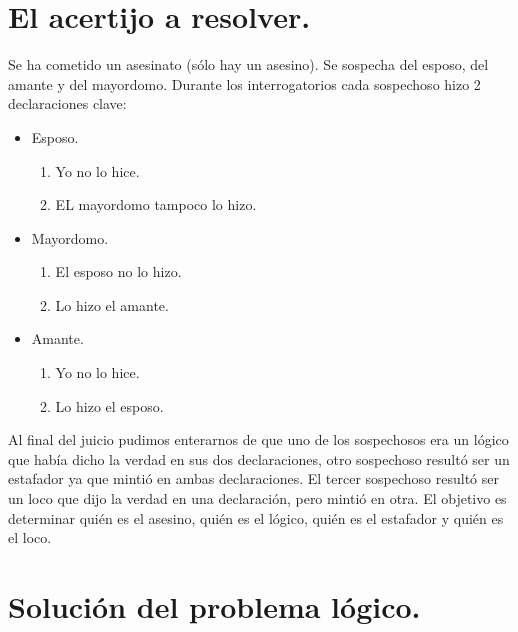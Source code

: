 \documentclass[letterpaper,11pt]{article}
\begin{document}

    \section{El acertijo a resolver.}
    Se ha cometido un asesinato (sólo hay un asesino). Se sospecha del esposo,
    del amante y del mayordomo. Durante los interrogatorios cada sospechoso 
    hizo 2 declaraciones clave:
    \begin{itemize}
        \item Esposo.
        \begin{enumerate}
            \item Yo no lo hice.
            \item EL mayordomo tampoco lo hizo.
        \end{enumerate}
        \item Mayordomo.
        \begin{enumerate}
            \item El esposo no lo hizo.
            \item Lo hizo el amante.
        \end{enumerate}
        \item Amante.
        \begin{enumerate}
            \item Yo no lo hice.
            \item Lo hizo el esposo.
        \end{enumerate}
    \end{itemize}

    Al final del juicio pudimos enterarnos de que uno de los sospechosos era un
    lógico que había dicho la verdad en sus dos declaraciones, otro sospechoso
    resultó ser un estafador ya que mintió en ambas declaraciones. El tercer 
    sospechoso resultó ser un loco que dijo la verdad en una declaración, pero 
    mintió en otra.
    El objetivo es determinar quién es el asesino, quién es el lógico, quién es
    el estafador y quién es el loco.

    \section{Solución del problema lógico.}
\end{document}
